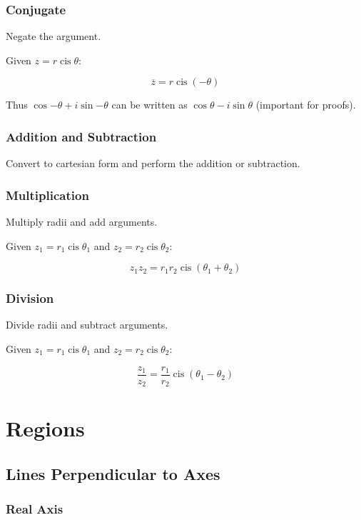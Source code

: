 \documentclass[a4paper,11pt]{article}
\DeclareMathOperator\cis{cis}
\begin{document}
\subsubsection{Conjugate}

Negate the argument.

Given $z = r \cis{\theta}$:

$$
\overline{z} = r \cis(-\theta)
$$

Thus $\cos{-\theta} + i\sin{-\theta}$ can be written as
$\cos{\theta} - i\sin{\theta}$ (important for proofs).


\subsubsection{Addition and Subtraction}

Convert to cartesian form and perform the addition or subtraction.


\subsubsection{Multiplication}

Multiply radii and add arguments.

Given $z_1 = r_1 \cis{\theta_1}$ and $z_2 = r_2 \cis{\theta_2}$:

$$
z_1 z_2 = r_1 r_2 \cis(\theta_1 + \theta_2)
$$


\subsubsection{Division}

Divide radii and subtract arguments.

Given $z_1 = r_1 \cis{\theta_1}$ and $z_2 = r_2 \cis{\theta_2}$:

$$
\frac{z_1}{z_2} = \frac{r_1}{r_2} \cis(\theta_1 - \theta_2)
$$




\section{Regions}

\subsection{Lines Perpendicular to Axes}

\subsubsection{Real Axis}
\end{document}
